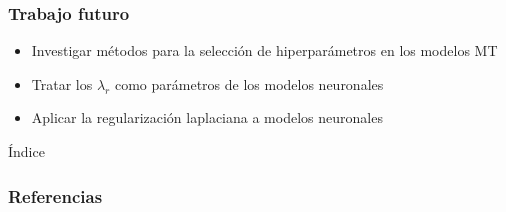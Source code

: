 \documentclass[aspectratio=43,spanish]{beamer}
\begin{document}
\begin{frame}
      \frametitle{Trabajo futuro}

      \begin{itemize}
            \item Investigar métodos para la selección de hiperparámetros en los modelos MT 
            \item Tratar los $\lambda_r$ como parámetros de los modelos neuronales
            \item Aplicar la regularización laplaciana a modelos neuronales
      \end{itemize}

\end{frame}


\backmatter

\begin{frame}[noframenumbering]{Índice}{}
      \tableofcontents
\end{frame}

\begin{frame}
      \frametitle{Referencias}

      \printbibliography

\end{frame}

\appendix
\end{document}
